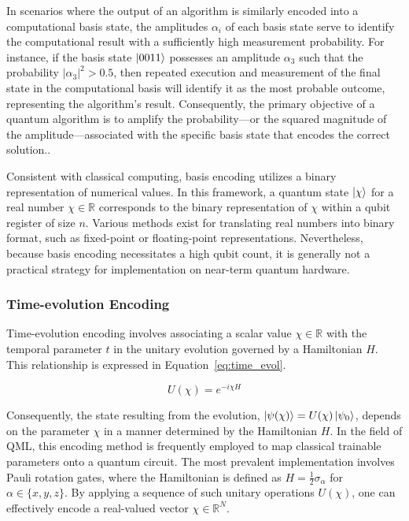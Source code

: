 \documentclass[en]{dimscthesis}
\begin{document}
In scenarios where the output of an algorithm is similarly encoded into a computational basis state, the amplitudes $\alpha_i$ of each basis state serve to identify the computational result with a sufficiently high measurement probability. For instance, if the basis state $\ket{0011}$ possesses an amplitude $\alpha_3$ such that the probability $|\alpha_3|^2 > 0.5$, then repeated execution and measurement of the final state in the computational basis will identify it as the most probable outcome, representing the algorithm's result. Consequently, the primary objective of a quantum algorithm is to amplify the probability—or the squared magnitude of the amplitude—associated with the specific basis state that encodes the correct solution..

Consistent with classical computing, basis encoding utilizes a binary representation of numerical values. In this framework, a quantum state $\ket{\chi}$ for a real number $\chi \in \mathbb{R}$ corresponds to the binary representation of $\chi$ within a qubit register of size $n$. Various methods exist for translating real numbers into binary format, such as fixed-point or floating-point representations. Nevertheless, because basis encoding necessitates a high qubit count, it is generally not a practical strategy for implementation on near-term quantum hardware.

\subsubsection{Time-evolution Encoding}

Time-evolution encoding involves associating a scalar value $\chi \in \mathbb{R}$ with the temporal parameter $t$ in the unitary evolution governed by a Hamiltonian $H$. This relationship is expressed in Equation~\ref{eq:time_evol}.

\begin{equation}
	U(\chi) = e^{-i\chi H}
	\label{eq:time_evol}
\end{equation}

Consequently, the state resulting from the evolution, $\ket{\psi(\chi)} = U(\chi)\ket{\psi_0}$, depends on the parameter $\chi$ in a manner determined by the Hamiltonian $H$. In the field of QML, this encoding method is frequently employed to map classical trainable parameters onto a quantum circuit. The most prevalent implementation involves Pauli rotation gates, where the Hamiltonian is defined as $H = \frac{1}{2} \sigma_\alpha$ for $\alpha \in \{x, y, z\}$. By applying a sequence of such unitary operations $U(\chi)$, one can effectively encode a real-valued vector $\chi \in \mathbb{R}^N$.
\end{document}
